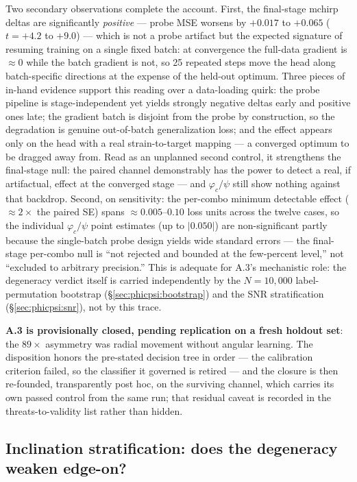 Two secondary observations complete the account.
First, the final-stage mchirp deltas are significantly \emph{positive} --- probe MSE worsens by $+0.017$ to $+0.065$ ($t = +4.2$ to $+9.0$) --- which is not a probe artifact but the expected signature of resuming training on a single fixed batch: at convergence the full-data gradient is ${\approx}0$ while the batch gradient is not, so 25 repeated steps move the head along batch-specific directions at the expense of the held-out optimum.
Three pieces of in-hand evidence support this reading over a data-loading quirk: the probe pipeline is stage-independent yet yields strongly negative deltas early and positive ones late; the gradient batch is disjoint from the probe by construction, so the degradation is genuine out-of-batch generalization loss; and the effect appears only on the head with a real strain-to-target mapping --- a converged optimum to be dragged away from.
Read as an unplanned second control, it strengthens the final-stage null: the paired channel demonstrably has the power to detect a real, if artifactual, effect at the converged stage --- and $\varphi_c/\psi$ still show nothing against that backdrop.
Second, on sensitivity: the per-combo minimum detectable effect (${\approx}2\times$ the paired SE) spans ${\approx}0.005$--$0.10$ loss units across the twelve cases, so the individual $\varphi_c/\psi$ point estimates (up to $|0.050|$) are non-significant partly because the single-batch probe design yields wide standard errors --- the final-stage per-combo null is ``not rejected and bounded at the few-percent level,'' not ``excluded to arbitrary precision.''
This is adequate for A.3's mechanistic role: the degeneracy verdict itself is carried independently by the $N = 10{,}000$ label-permutation bootstrap (\S\ref{sec:phicpsi:bootstrap}) and the SNR stratification (\S\ref{sec:phicpsi:snr}), not by this trace.

\textbf{A.3 is provisionally closed, pending replication on a fresh holdout set}: the $89\times$ asymmetry was radial movement without angular learning.
The disposition honors the pre-stated decision tree in order --- the calibration criterion failed, so the classifier it governed is retired --- and the closure is then re-founded, transparently post hoc, on the surviving channel, which carries its own passed control from the same run; that residual caveat is recorded in the threats-to-validity list rather than hidden.

\subsection{Inclination stratification: does the degeneracy weaken edge-on?}
\label{sec:phicpsi:inclination}

